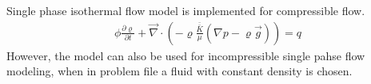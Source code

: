 Single phase isothermal flow model is implemented for compressible flow. \begin{align*} \phi \frac{\partial \varrho}{\partial t} + \vec{\nabla} \cdot (- \varrho \frac{\bar{\bar{K}}}{\mu} ( \nabla p -\varrho \vec{g})) = q \end{align*} However, the model can also be used for incompressible single pahse flow modeling, when in problem file a fluid with constant density is chosen. 
